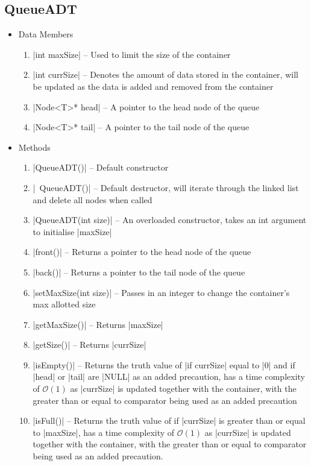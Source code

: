 \documentclass{report}
\begin{document}
\subsection{QueueADT}
\begin{itemize}
	\item Data Members
	\begin{enumerate}
		\item |int maxSize| -- Used to limit the size of the container
		\item |int currSize| -- Denotes the amount of data stored in the container, will be updated as the data is added and removed from the container
		\item |Node<T>* head| -- A pointer to the head node of the queue
		\item |Node<T>* tail| -- A pointer to the tail node of the queue
	\end{enumerate}
	\item Methods
	\begin{enumerate}
		\item |QueueADT()| -- Default constructor
		\item |~QueueADT()| -- Default destructor, will iterate through the linked list and delete all nodes when called
		\item |QueueADT(int size)| -- An overloaded constructor, takes an int argument to initialise |maxSize|
		\item |front()| -- Returns a pointer to the head node of the queue
		\item |back()| -- Returns a pointer to the tail node of the queue
		\item |setMaxSize(int size)| -- Passes in an integer to change the container's max allotted size
		\item |getMaxSize()| -- Returns |maxSize|
		\item |getSize()| -- Returns |currSize|
		\item |isEmpty()| -- Returns the truth value of |if currSize| equal to |0| and if |head| or |tail| are |NULL| as an added precaution, has a time complexity of \(\mathcal{O}(1)\) as |currSize| is updated together with the container, with the greater than or equal to comparator being used as an added precaution
		\item |isFull()| -- Returns the truth value of if |currSize| is greater than or equal to |maxSize|, has a time complexity of \(\mathcal{O}(1)\) as |currSize| is updated together with the container, with the greater than or equal to comparator being used as an added precaution.

\end{enumerate}
\end{itemize}
\end{document}
